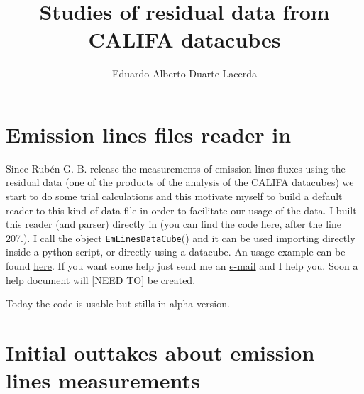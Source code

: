 \documentclass[a4paper,11pt]{article}
\begin{document}
\title{Studies of residual data from CALIFA datacubes}
\author{Eduardo Alberto Duarte Lacerda}

\section{Emission lines files reader in \pycasso}

Since Rubén G. B. release the measurements of emission lines fluxes using the residual data (one of the products of the \starlight analysis of the CALIFA datacubes) we start to do some trial calculations and this motivate myself to build a default reader to this kind of data file in order to facilitate our usage of the data. I built this reader (and parser) directly in \pycasso (you can find the code \href{https://bitbucket.org/astro_ufsc/pycasso/src/38741376583e216a040b266958e673d2b4b628d5/src/pycasso/fitsdatacube.py?at=default}{here},  after the line 207.). I call the object \texttt{EmLinesDataCube}() and it can be used importing directly inside a python script, or directly using a \pycasso datacube. An usage example can be found \href{https://bitbucket.org/astro_ufsc/pycasso/src/38741376583e216a040b266958e673d2b4b628d5/contrib/emLinesExample.py?at=default}{here}. If you want some help just send me an \href{mailto:lacerda@iaa.es}{e-mail} and I help you. Soon a help document will [NEED TO] be created.

Today the code is usable but stills in alpha version.

\section{Initial outtakes about emission lines measurements}

\end{document}
